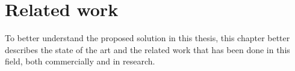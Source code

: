 
\chapter{Related work}\label{chapter:related_work}

	To better understand the proposed solution in this thesis, this chapter better describes the state of the art and the related work that has been done in this field, both commercially and in research.
	
	
